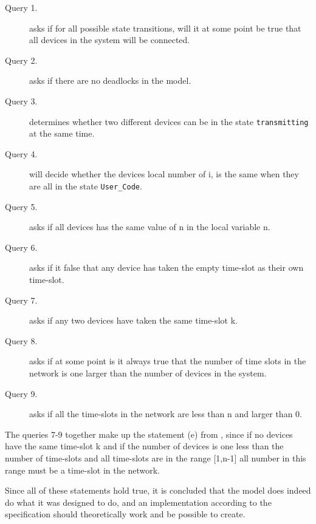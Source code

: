 \begin{description}
	\item [Query 1.] asks if for all possible state transitions, will it at some point be true that all devices in the system will be connected.
	\item [Query 2.] asks if there are no deadlocks in the model.
	\item [Query 3.] determines whether two different devices can be in the state \texttt{transmitting} at the same time.
	\item [Query 4.] will decide whether the devices local number of i, is the same when they are all in the state \texttt{User_Code}.
	\item [Query 5.] asks if all devices has the same value of n in the local variable n.
	\item [Query 6.] asks if it false that any device has taken the empty time-slot as their own time-slot.
	\item [Query 7.] asks if any two devices have taken the same time-slot k.
	\item [Query 8.] asks if at some point is it always true that the number of time slots in the network is one larger than the number of devices in the system.
	\item [Query 9.] asks if all the time-slots in the network are less than n and larger than 0.
\end{description}

The queries 7-9 together make up the statement (e) from , since if no devices have the same time-slot k and if the number of devices is one less than the number of time-slots and all time-slots are in the range [1,n-1] all number in this range must be a time-slot in the network.

Since all of these statements hold true, it is concluded that the model does indeed do what it was designed to do, and an implementation according to the specification should theoretically work and be possible to create.
